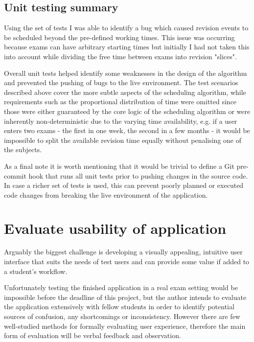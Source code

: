 \documentclass[bsc,frontabs,twoside,singlespacing,parskip]{infthesis}     %
\begin{document}
		\subsection{Unit testing summary}
		Using the set of tests I was able to identify a bug which caused revision events to be scheduled beyond the pre-defined working times. This issue was occurring because exams can have arbitrary starting times but initially I had not taken this into account while dividing the free time between exams into revision "slices".

		Overall unit tests helped identify some weaknesses in the design of the algorithm and prevented the pushing of bugs to the live environment. The test scenarios described above cover the more subtle aspects of the scheduling algorithm, while requirements such as the proportional distribution of time were omitted since those were either guaranteed by the core logic of the scheduling algorithm or were inherently non-deterministic due to the varying time availability, e.g. if a user enters two exams - the first in one week, the second in a few months - it would be impossible to split the available revision time equally without penalising one of the subjects.

		As a final note it is worth mentioning that it would be trivial to define a Git pre-commit hook that runs all unit tests prior to pushing changes in the source code. In case a richer set of tests is used, this can prevent poorly planned or executed code changes from breaking the live environment of the application.


	\section{Evaluate usability of application}\label{user_eval}

		Arguably the biggest challenge is developing a visually appealing, intuitive user interface that suits the needs of test users and can provide some value if added to a student's workflow.

		Unfortunately testing the finished application in a real exam setting would be impossible before the deadline of this project, but the author intends to evaluate the application extensively with fellow students in order to identify potential sources of confusion, any shortcomings or inconsistency. However there are few well-studied methods for formally evaluating user experience, therefore the main form of evaluation will be verbal feedback and observation.
\end{document}
